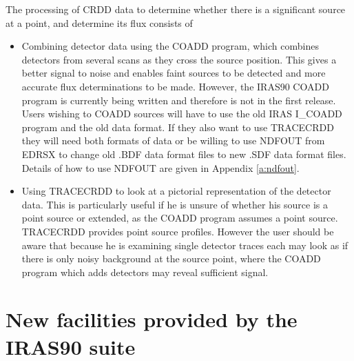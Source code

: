 \documentclass[twoside,11pt]{starlink}
\begin{document}
The processing of CRDD data to determine whether there is a significant source
at a point, and determine its flux consists of
\begin{itemize}
\item Combining detector data using the COADD program, which combines detectors
from several scans as they cross the source position. This gives a better
signal to noise and enables faint sources to be detected and more accurate flux
determinations to be made.
However, the IRAS90 COADD program is currently being written and therefore is
not in the first release. Users wishing to COADD sources will have to use the
old IRAS I\_COADD program and the old data format. If they also want to use
TRACECRDD they will need both formats of data or be willing to use NDFOUT from
EDRSX to change old .BDF data format files to new .SDF data format files.
Details of how to use NDFOUT are given in Appendix \ref{a:ndfout}.
\item Using TRACECRDD to look at a pictorial representation of the detector
data. This is particularly useful if he is unsure of whether his source is a
point source or extended, as the COADD program assumes a point source.
TRACECRDD provides point source profiles.
However the user should be aware that because he is examining single detector
traces each may look as if there is only noisy background at the source point,
where the COADD program which adds detectors may reveal sufficient signal.
\end{itemize}
\section{New facilities provided by the IRAS90 suite
\label{m:newfac}}
\end{document}
